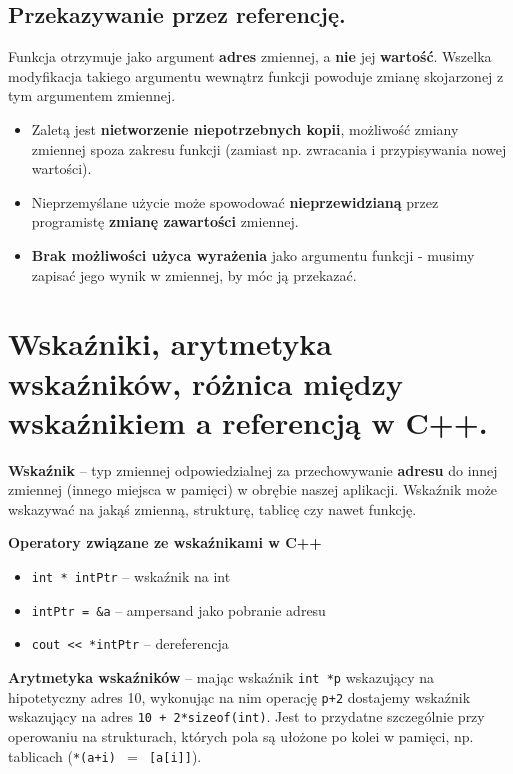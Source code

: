 \documentclass[main.tex]{subfiles}
\begin{document}
    \subsection{Przekazywanie przez referencję.}
    Funkcja otrzymuje jako argument \textbf{adres} zmiennej, a \textbf{nie} jej \textbf{wartość}. Wszelka modyfikacja takiego argumentu wewnątrz funkcji powoduje zmianę skojarzonej
    z tym argumentem zmiennej.
    \begin{itemize}
        \item Zaletą jest \textbf{nietworzenie niepotrzebnych kopii}, możliwość zmiany zmiennej spoza zakresu funkcji (zamiast
        np. zwracania i przypisywania nowej wartości).
        \item Nieprzemyślane użycie może spowodować \textbf{nieprzewidzianą} przez programistę \textbf{zmianę zawartości} zmiennej.
        \item \textbf{Brak możliwości użyca wyrażenia} jako argumentu funkcji - musimy zapisać jego wynik w zmiennej, by móc
        ją przekazać.
    \end{itemize}


    \section{Wskaźniki, arytmetyka wskaźników, różnica między wskaźnikiem a referencją w C++.}
    \textbf{Wskaźnik} – typ zmiennej odpowiedzialnej za przechowywanie \textbf{adresu} do innej zmiennej
    (innego miejsca w pamięci) w obrębie naszej aplikacji.
    Wskaźnik może wskazywać na jakąś zmienną, strukturę, tablicę czy nawet funkcję.

    \noindent\textbf{Operatory związane ze wskaźnikami w C++}

    \begin{itemize}[noitemsep]
        \item \texttt{int * intPtr} -- wskaźnik na int
        \item \texttt{intPtr = \&a} -- ampersand jako pobranie adresu
        \item \texttt{cout << *intPtr} -- dereferencja
    \end{itemize}

    \noindent \textbf{Arytmetyka wskaźników} --
    mając wskaźnik \texttt{int *p} wskazujący na hipotetyczny adres 10, wykonując na nim operację \texttt{p+2}
    dostajemy wskaźnik wskazujący na adres \texttt{10 + 2*sizeof(int)}.
    Jest to przydatne szczególnie przy operowaniu na strukturach, których pola są ułożone po kolei w pamięci, np. tablicach
    (\texttt{*(a+i) $=$ \texttt[a[i]]}).\\
\end{document}
